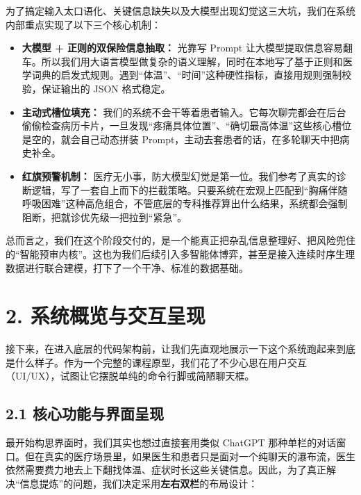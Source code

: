 \documentclass[UTF8,a4paper,12pt,fontset=none]{ctexart}
\begin{document}
为了搞定输入太口语化、关键信息缺失以及大模型出现幻觉这三大坑，我们在系统内部重点实现了以下三个核心机制：

\begin{itemize}
\item \textbf{大模型 + 正则的双保险信息抽取：} 光靠写 Prompt 让大模型提取信息容易翻车。所以我们用大语言模型做复杂的语义理解，同时在本地写了基于正则和医学词典的启发式规则。遇到“体温”、“时间”这种硬性指标，直接用规则强制校验，保证输出的 JSON 格式稳定。
\item \textbf{主动式槽位填充：} 我们的系统不会干等着患者输入。它每次聊完都会在后台偷偷检查病历卡片，一旦发现“疼痛具体位置”、“确切最高体温”这些核心槽位是空的，就会自己动态拼装 Prompt，主动去套患者的话，在多轮聊天中把病史补全。
\item \textbf{红旗预警机制：} 医疗无小事，防大模型幻觉是第一位。我们参考了真实的诊断逻辑，写了一套自上而下的拦截策略。只要系统在宏观上匹配到“胸痛伴随呼吸困难”这种高危组合，不管底层的专科推荐算出什么结果，系统都会强制阻断，把就诊优先级一把拉到“紧急”。
\end{itemize}

总而言之，我们在这个阶段交付的，是一个能真正把杂乱信息整理好、把风险兜住的“智能预审内核”。这也为我们后续引入多智能体博弈，甚至是接入连续时序生理数据进行联合建模，打下了一个干净、标准的数据基础。

\section{2. 系统概览与交互呈现}

接下来，在进入底层的代码架构前，让我们先直观地展示一下这个系统跑起来到底是什么样子。作为一个完整的课程原型，我们花了不少心思在用户交互（UI/UX），试图让它摆脱单纯的命令行脚或简陋聊天框。

\subsection{2.1 核心功能与界面呈现}

最开始构思界面时，我们其实也想过直接套用类似 ChatGPT 那种单栏的对话窗口。但在真实的医疗场景里，如果医生和患者只是面对一个纯聊天的瀑布流，医生依然需要费力地去上下翻找体温、症状时长这些关键信息。因此，为了真正解决“信息提炼”的问题，我们决定采用\textbf{左右双栏}的布局设计：
\end{document}

